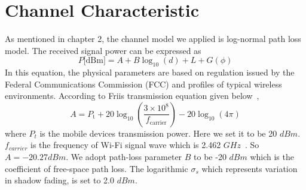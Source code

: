\section{Channel Characteristic}
As mentioned in chapter 2, the channel model we applied is log-normal path loss model. The received signal power can be expressed as
\begin{equation} \label{equation:Power}
P \text{[dBm]}
= A + B \log_{10}(d) + L + G (\phi)
\end{equation}
In this equation, the physical parameters are based on regulation issued by the Federal Communications Commission (FCC) and profiles of typical wireless environments. According to Friis transmission equation given below~\cite{friis1946note},
\begin{equation*}
A = P_{\mathrm{t}} + 20 \log_{10} \left( \frac{3 \times 10^8}{f_{\mathrm{carrier}}} \right) - 20\log_{10}(4\pi) 
\end{equation*}
where $P_{t}$ is the mobile devices transmission power. Here we set it to be 20 $dBm$. $f_{carrier}$ is the frequency of Wi-Fi signal wave which is 2.462 $GHz$~\cite{goldsmith2005wireless}. So $A = -20.27 dBm$.
We adopt path-loss parameter $B$ to be -20 $dBm$ which is the coefficient of free-space path loss. The logarithmic $\sigma_{s}$ which represents variation in shadow fading, is set to 2.0 $dBm$.

